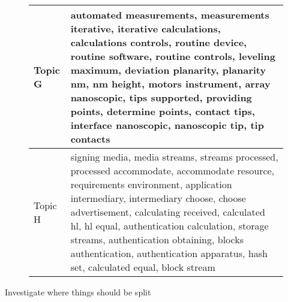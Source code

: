 \begin{figure}[!h]
\begin{center}
\begin{tabular}{|l l|}
Topic G  & automated measurements, measurements iterative, iterative calculations, calculations controls, routine device, routine software, routine controls, leveling maximum, deviation planarity, planarity nm, nm height, motors instrument, array nanoscopic, tips supported, providing points, determine points, contact tips, interface nanoscopic, nanoscopic tip, tip contacts \\ \hline
Topic H  & signing media, media streams, streams processed, processed accommodate, accommodate resource, requirements environment, application intermediary, intermediary choose, choose advertisement, calculating received, calculated hl, hl equal, authentication calculation, storage streams, authentication obtaining, blocks authentication, authentication apparatus, hash set, calculated equal, block stream \\ \hline
\end{tabular}
\end{center}
\end{figure}

Investigate where things should be split

